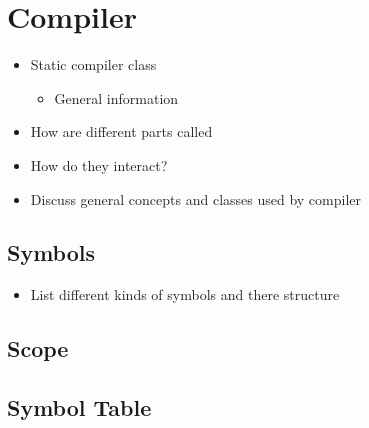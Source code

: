\section{Compiler}
\begin{itemize}
    \item Static compiler class
    \begin{itemize}
        \item General information
    \end{itemize}
    \item How are different parts called
    \item How do they interact?
    \item Discuss general concepts and classes used by compiler
\end{itemize}

\subsection{Symbols}
\begin{itemize}
    \item List different kinds of symbols and there structure
\end{itemize}

\subsection{Scope}

\subsection{Symbol Table}